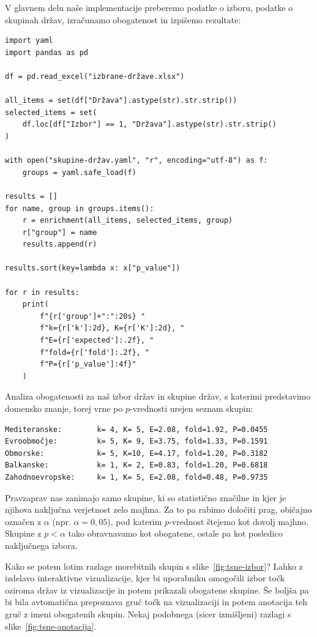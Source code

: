 V glavnem delu naše implementacije preberemo podatke o izboru, podatke o skupinah držav, izračunamo obogatenost in izpišemo rezultate:
\vspace*{3mm}
\begin{lstlisting}
import yaml
import pandas as pd

df = pd.read_excel("izbrane-države.xlsx")

all_items = set(df["Država"].astype(str).str.strip())
selected_items = set(
    df.loc[df["Izbor"] == 1, "Država"].astype(str).str.strip()
)

with open("skupine-držav.yaml", "r", encoding="utf-8") as f:
    groups = yaml.safe_load(f)

results = []
for name, group in groups.items():
    r = enrichment(all_items, selected_items, group)
    r["group"] = name
    results.append(r)

results.sort(key=lambda x: x["p_value"])

for r in results:
    print(
        f"{r['group']+":":20s} "
        f"k={r['k']:2d}, K={r['K']:2d}, "
        f"E={r['expected']:.2f}, "
        f"fold={r['fold']:.2f}, "
        f"P={r['p_value']:4f}"
    )
\end{lstlisting}

Analiza obogatenosti za naš izbor držav in skupine držav, s katerimi predstavimo domensko znanje, torej vrne po $p$-vrednosti urejen seznam skupin:
%
{\small
\begin{verbatim}
Mediteranske:        k= 4, K= 5, E=2.08, fold=1.92, P=0.0455
Evroobmočje:         k= 5, K= 9, E=3.75, fold=1.33, P=0.1591
Obmorske:            k= 5, K=10, E=4.17, fold=1.20, P=0.3182
Balkanske:           k= 1, K= 2, E=0.83, fold=1.20, P=0.6818
Zahodnoevropske:     k= 1, K= 5, E=2.08, fold=0.48, P=0.9735
\end{verbatim}
}
%
Pravzaprav nas zanimajo samo skupine, ki so statistično značilne in kjer je njihova naključna verjetnost zelo majhna. Za to pa rabimo določiti prag, 
%
%
običajno označen z $\alpha$ (npr. $\alpha = 0{,}05$), pod katerim $p$-vrednost štejemo kot dovolj majhno. Skupine z $p < \alpha$ tako obravnavamo kot obogatene, ostale pa kot posledico naključnega izbora.

Kako se potem lotim razlage morebitnih skupin s slike~\ref{fig:tsne-izbor}? Lahko z izdelavo interaktivne vizualizacije, kjer bi uporabniku omogočili izbor točk oziroma držav iz vizualizacije in potem prikazali obogatene skupine. Še boljša pa bi bila avtomatična prepoznava gruč točk na vizualizaciji in potem anotacija teh gruč z imeni obogatenih skupin. Nekaj podobnega (sicer izmišljeni) razlagi s slike~\ref{fig:tsne-anotacija}.

